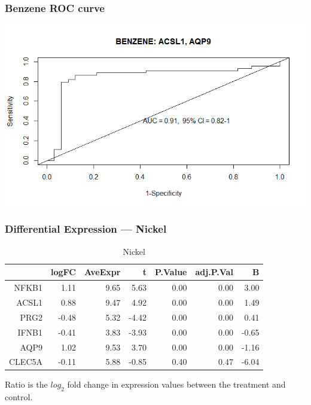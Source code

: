 \documentclass{beamer}
\begin{document}
\begin{frame}
	 \frametitle{Benzene ROC curve}
		\centering
	 	\includegraphics[scale=0.45]{../paper/figs/benzene1.png} 
\end{frame}

\begin{frame}[fragile]
  	\frametitle{Differential Expression --- Nickel}
 		\begin{table}[ht]
		\caption {Nickel} \label{tab:nickel} 
		\centering
		\begin{tabular}{rrrrrrr}
 			\hline
 			& logFC & AveExpr & t & P.Value & adj.P.Val & B \\ 
  			\hline
			NFKB1 & 1.11 & 9.65 & 5.63 & 0.00 & 0.00 & 3.00 \\ 
  			ACSL1 & 0.88 & 9.47 & 4.92 & 0.00 & 0.00 & 1.49 \\ 
  			PRG2 & -0.48 & 5.32 & -4.42 & 0.00 & 0.00 & 0.41 \\ 
  			IFNB1 & -0.41 & 3.83 & -3.93 & 0.00 & 0.00 & -0.65 \\ 
  			AQP9 & 1.02 & 9.53 & 3.70 & 0.00 & 0.00 & -1.16 \\ 
  			CLEC5A & -0.11 & 5.88 & -0.85 & 0.40 & 0.47 & -6.04 \\ 
  			 \hline
		\end{tabular}
		\end{table}
		Ratio is the $log_{2}$ fold change in expression values between the treatment and control.
\end{frame}
\end{document}
